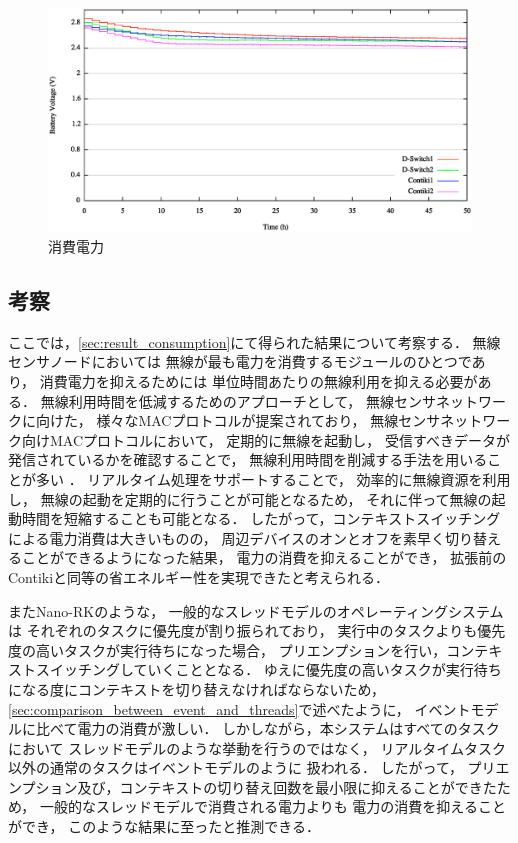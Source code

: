 \begin{figure}[htbp]
 \begin{center}
  \includegraphics[width=150mm]{./images/power_consumption.eps}
 \end{center}
 \caption{消費電力}
 \label{fig:power_consumption}
\end{figure}



\subsection{考察}
ここでは，\ref{sec:result_consumption}にて得られた結果について考察する．
無線センサノードにおいては
無線が最も電力を消費するモジュールのひとつであり，
消費電力を抑えるためには
単位時間あたりの無線利用を抑える必要がある．
無線利用時間を低減するためのアプローチとして，
無線センサネットワークに向けた，
様々なMACプロトコルが提案されており，
無線センサネットワーク向けMACプロトコルにおいて，
定期的に無線を起動し，
受信すべきデータが発信されているかを確認することで，
無線利用時間を削減する手法を用いることが多い
\cite{polastre2004versatile}．
リアルタイム処理をサポートすることで，
効率的に無線資源を利用し，
無線の起動を定期的に行うことが可能となるため，
それに伴って無線の起動時間を短縮することも可能となる．
したがって，コンテキストスイッチングによる電力消費は大きいものの，
周辺デバイスのオンとオフを素早く切り替えることができるようになった結果，
電力の消費を抑えることができ，
拡張前のContikiと同等の省エネルギー性を実現できたと考えられる．

またNano-RK\cite{Eswaran:2005:NER:1106608.1106672}のような，
一般的なスレッドモデルのオペレーティングシステムは
それぞれのタスクに優先度が割り振られており，
実行中のタスクよりも優先度の高いタスクが実行待ちになった場合，
プリエンプションを行い，コンテキストスイッチングしていくこととなる．
ゆえに優先度の高いタスクが実行待ちになる度にコンテキストを切り替えなければならないため，
\ref{sec:comparison_between_event_and_threads}で述べたように，
イベントモデルに比べて電力の消費が激しい．
しかしながら，本システムはすべてのタスクにおいて
スレッドモデルのような挙動を行うのではなく，
リアルタイムタスク以外の通常のタスクはイベントモデルのように
扱われる．
したがって，
プリエンプション及び，コンテキストの切り替え回数を最小限に抑えることができたため，
一般的なスレッドモデルで消費される電力よりも
電力の消費を抑えることができ，
このような結果に至ったと推測できる．


